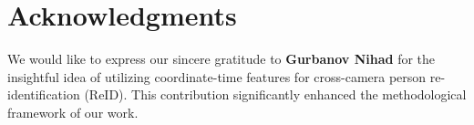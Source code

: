 \documentclass[12pt, a4paper]{article}
\begin{document}
\section*{Acknowledgments}

We would like to express our sincere gratitude to\textbf{ Gurbanov Nihad} for the insightful idea of utilizing coordinate-time features for cross-camera person re-identification (ReID). This contribution significantly enhanced the methodological framework of our work.

\begin{multicols}{2}
\small
\printbibliography
\end{multicols}
\end{document}
